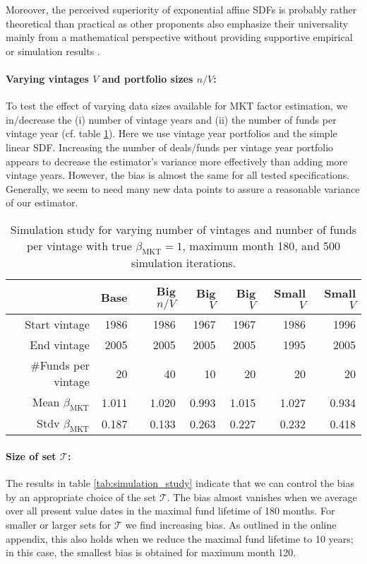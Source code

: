 \documentclass[12pt]{article}
\begin{document}
Moreover, the perceived superiority of exponential affine SDFs is probably rather theoretical than practical as other proponents also emphasize their universality mainly from a mathematical perspective without providing supportive empirical or simulation results \citep{GM07,BMP08}.

\paragraph{Varying vintages $V$ and portfolio sizes $n/V$:}
To test the effect of varying data sizes available for MKT factor estimation, we in/decrease the (i) number of vintage years and (ii) the number of funds per vintage year (cf. table \ref{tab:simulation_study_size}).
Here we use vintage year portfolios and the simple linear SDF.
Increasing the number of deals/funds per vintage year portfolio appears to decrease the estimator's variance more effectively than adding more vintage years.
However, the bias is almost the same for all tested specifications.
Generally, we seem to need many new data points to assure a reasonable variance of our estimator.

\begin{table}[ht]
	\centering
	\begin{tabular}{rrrrrrr}
		& Base & Big $n/V$ & Big $V$ & Big $V$ & Small $V$ & Small $V$ \\ 
		\hline
		\hline
		Start vintage & 1986 & 1986 & 1967 & 1967 & 1986 & 1996 \\ 
		End vintage & 2005 & 2005 & 2005 & 2005 & 1995 & 2005 \\ 
		\#Funds per vintage & 20 & 40 & 10 & 20 & 20 & 20 \\ 
		\hline
		Mean $\beta_{\mathrm{MKT}}$ & 1.011 & 1.020 & 0.993 & 1.015 & 1.027 & 0.934 \\ 
		Stdv $\beta_{\mathrm{MKT}}$ & 0.187 & 0.133 & 0.263 & 0.227 & 0.232 & 0.418 \\ 
		\hline
		\hline
	\end{tabular}
	\caption{Simulation study for varying  number of vintages and number of funds per vintage with true $\beta_{\mathrm{MKT}}=1$, maximum month 180, and 500 simulation iterations.} 
	\label{tab:simulation_study_size}
\end{table}



\paragraph{Size of set $\mathcal{T}$:}
The results in table \ref{tab:simulation_study} indicate that we can control the bias by 
an appropriate choice of the set $\mathcal{T}$.
The bias almost vanishes when we average over all present value dates in the maximal fund lifetime of 180 months. 
For smaller or larger sets for $\mathcal{T}$ we find increasing bias.
As outlined in the online appendix, this also holds when we reduce the maximal fund lifetime to 10 years; in this case, the smallest bias is obtained for maximum month 120.
\end{document}
